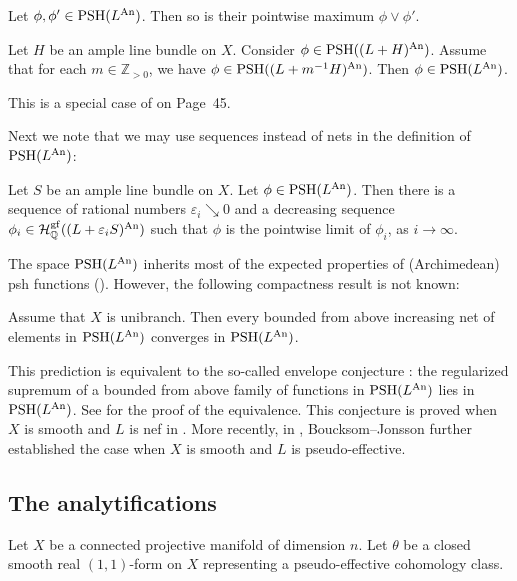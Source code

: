 \begin{proposition}[{\cite[Theorem~4.7]{BJ22}}]\label{prop:BJclosedmax}
    Let $\phi,\phi'\in \mathrm{PSH}(L^{\mathrm{An}})$. Then so is their pointwise maximum $\phi\lor \phi'$.
\end{proposition}

\begin{proposition}\label{prop:BJdecseqstab}
    Let $H$ be an ample line bundle on $X$. Consider $\phi\in \mathrm{PSH}((L+H)^{\mathrm{An}})$.
    Assume that for each $m\in \mathbb{Z}_{>0}$, we have $\phi\in \mathrm{PSH}((L+m^{-1}H)^{\mathrm{An}})$. Then $\phi\in \mathrm{PSH}(L^{\mathrm{An}})$.
\end{proposition}
This is a special case of \cite[(PSH2)]{BJ22} on Page~45.

Next we note that we may use sequences instead of nets in the definition of $\mathrm{PSH}(L^{\mathrm{An}})$:
\begin{theorem}[{\cite[Corollary~12.18]{BJ22}}]\label{thm:BJappseq}
Let $S$ be an ample line bundle on $X$. Let $\phi \in \mathrm{PSH}(L^{\mathrm{An}})$.
Then there is a sequence of rational numbers $\varepsilon_i\searrow 0$ and a decreasing sequence $\phi_i\in \mathcal{H}^{\mathrm{gf}}_{\mathbb{Q}}((L+\varepsilon_i S)^{\mathrm{An}})$ such that $\phi$ is the pointwise limit of $\phi_i$, as $i\to\infty$.
\end{theorem}


The space $\mathrm{PSH}(L^{\mathrm{An}})$ inherits most of the expected properties of (Archimedean) psh functions (\cite[Theorem~4.7]{BJ22}). However, the following compactness result is not known:
\begin{conjecture}[{\cite[\S 5]{BJ22}}]\label{conj:env}
Assume that $X$ is unibranch. Then every bounded from above increasing net of elements in $\mathrm{PSH}(L^{\mathrm{An}})$ converges in $\mathrm{PSH}(L^{\mathrm{An}})$.
\end{conjecture}
This prediction is equivalent to the so-called envelope conjecture \cite[Conjecture~5.14]{BJ22}: the regularized supremum of a bounded from above family of functions in $\mathrm{PSH}(L^{\mathrm{An}})$ lies in $\mathrm{PSH}(L^{\mathrm{An}})$. See \cite[Theorem~5.11]{BJ22} for the proof of the equivalence. This conjecture is proved when $X$ is smooth and $L$ is nef in \cite{BJ22}. More recently, in \cite{BJ22b}, Boucksom--Jonsson further established the case when $X$ is smooth and $L$ is pseudo-effective.


\subsection{The analytifications}
\label{subsec:analytifications}
Let $X$ be a connected projective manifold of dimension $n$. Let $\theta$ be a closed smooth real $(1,1)$-form on $X$ representing a pseudo-effective cohomology class.


